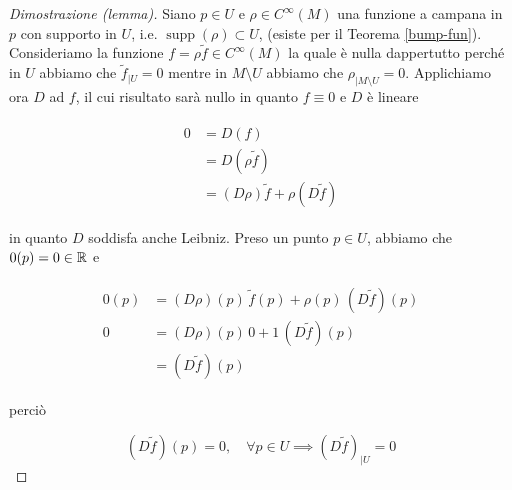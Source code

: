 \begin{proof}[Dimostrazione (lemma)]
	Siano $ p \in U $ e $ \rho \in C^{\infty}(M) $ una funzione a campana in $ p $ con supporto in $ U $, i.e. $ \operatorname{supp}(\rho) \subset U $, (esiste per il Teorema \ref{bump-fun}). Consideriamo la funzione $ f = \rho \tilde{f} \in C^{\infty}(M) $ la quale è nulla dappertutto perché in $ U $ abbiamo che $ \tilde{f}_{|U} = 0 $ mentre in $ M \setminus U $ abbiamo che $ \rho_{|M \setminus U} = 0 $. Applichiamo ora $ D $ ad $ f $, il cui risultato sarà nullo in quanto $ f \equiv 0 $ e $ D $ è lineare
	
	\begin{align}
		\begin{split}
			0 &= D(f)\\
			&= D (\rho \tilde{f})\\
			&= (D \rho) \tilde{f} + \rho (D \tilde{f})
		\end{split}
	\end{align}

	in quanto $ D $ soddisfa anche Leibniz. Preso un punto $ p \in U $, abbiamo che $ 0(p) = 0 \in \mathbb{R} $ e
	
	\begin{align}
		\begin{split}
			0(p) &= (D \rho)(p) \, \tilde{f}(p) + \rho(p) \, (D \tilde{f})(p)\\
			0 &= (D \rho)(p) \, 0 + 1 \, (D \tilde{f})(p)\\
			&= (D \tilde{f})(p)
		\end{split}
	\end{align}

	perciò
	
	\begin{equation}
		(D \tilde{f})(p) = 0, \quad \forall p \in U \implies (D \tilde{f})_{|U} = 0
	\end{equation}
\end{proof}


